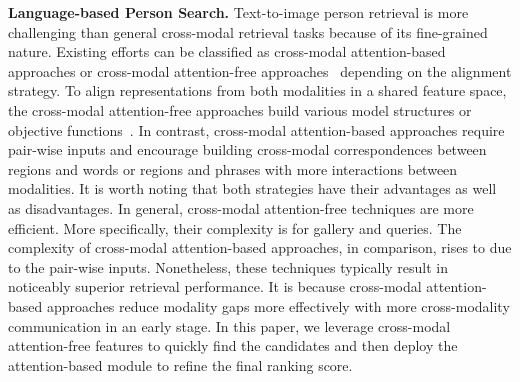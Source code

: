 \documentclass[sigconf]{acmart}
\begin{document}
\textbf{Language-based Person Search.}
Text-to-image person retrieval is more challenging than general cross-modal retrieval tasks because of its fine-grained nature. 
Existing efforts can be classified as cross-modal attention-based~\cite{li2017person, wang2022look, shu2023see, shao2022learning} approaches or cross-modal attention-free approaches~\cite{ding2021semantically, zheng2020dual, wang2022caibc, chen2022tipcb} depending on the alignment strategy.
To align representations from both modalities in a shared feature space, 
the cross-modal attention-free approaches build various model structures or objective functions~\cite{zheng2020dual}. 
In contrast, cross-modal attention-based approaches require pair-wise inputs and
encourage building cross-modal correspondences between regions and words or regions and phrases with more interactions between modalities. 
It is worth noting that both strategies have their advantages as well as disadvantages. 
In general, cross-modal attention-free techniques are more efficient. More specifically, their complexity is  for  gallery and  queries. 
The complexity of cross-modal attention-based approaches, in comparison, rises to  due to the pair-wise inputs. 
Nonetheless, these techniques typically result in noticeably superior retrieval performance. 
It is because cross-modal attention-based approaches reduce modality gaps more effectively with more cross-modality communication in an early stage.
In this paper, we leverage cross-modal attention-free features to quickly find the candidates and then deploy the attention-based module to refine the final ranking score.
\end{document}
